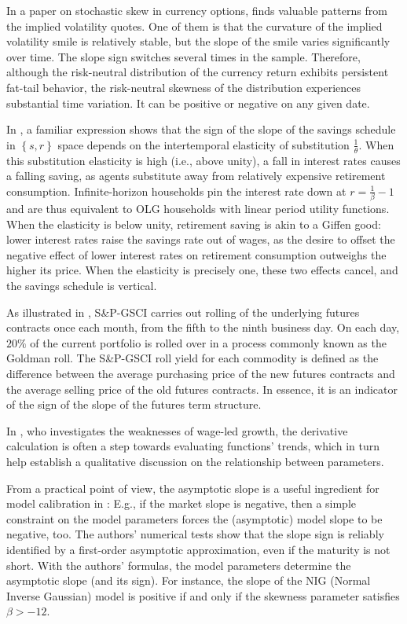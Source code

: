 \documentclass[11pt]{book}
\begin{document}
In a paper on stochastic skew in currency options, \cite{carr2007stochastic} finds valuable patterns from the implied volatility quotes. One of them is that the curvature
of the implied volatility smile is relatively stable, but the slope
of the smile varies significantly over time. The slope sign switches
several times in the sample. Therefore, although the risk-neutral
distribution of the currency return exhibits persistent fat-tail behavior,
the risk-neutral skewness of the distribution experiences substantial
time variation. It can be positive or negative on any given date.

In \cite{thwaites2015real}, a familiar expression shows that the
sign of the slope of the savings schedule in $\left\{ s,r\right\} $
space depends on the intertemporal elasticity of substitution $\frac{1}{\theta}$.
When this substitution elasticity is high (i.e., above unity), a fall
in interest rates causes a falling saving, as agents substitute away
from relatively expensive retirement consumption. Infinite-horizon
households pin the interest rate down at $r=\frac{1}{\beta}-1$ and
are thus equivalent to OLG households with linear period utility functions.
When the elasticity is below unity, retirement saving is akin to a
Giffen good: lower interest rates raise the savings rate out of wages,
as the desire to offset the negative effect of lower interest rates
on retirement consumption outweighs the higher its price. When the
elasticity is precisely one, these two effects cancel, and the savings
schedule is vertical.

As illustrated in \cite{leung2016speculative}, S\&P-GSCI carries
out rolling of the underlying futures contracts once each month, from
the fifth to the ninth business day. On each day, $20\%$ of the current
portfolio is rolled over in a process commonly known as the Goldman
roll. The S\&P-GSCI roll yield for each commodity is defined as the
difference between the average purchasing price of the new futures
contracts and the average selling price of the old futures contracts.
In essence, it is an indicator of the sign of the slope of the futures
term structure.

In \cite{skott2017weaknesses}, who investigates the weaknesses of wage-led growth, the derivative calculation
is often a step towards evaluating functions' trends, which in turn
help establish a qualitative discussion on the relationship between
parameters.

From a practical point of view, the asymptotic slope is a useful ingredient
for model calibration in \cite{pinter2017small}: E.g., if the market
slope is negative, then a simple constraint on the model parameters
forces the (asymptotic) model slope to be negative, too. The authors'
numerical tests show that the slope sign is reliably identified by
a first-order asymptotic approximation, even if the maturity is not
short. With the authors' formulas, the model parameters determine
the asymptotic slope (and its sign). For instance, the slope of the
NIG (Normal Inverse Gaussian) model is positive if and only if the
skewness parameter satisfies $\beta>-12$.
\end{document}
